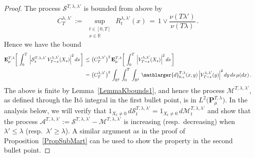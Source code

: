 \documentclass[10pt]{article}
\numberwithin{equation}{section}
\theoremstyle{definition}
\newcommand{\R}{{\mathbb R}}
\begin{document}
\begin{proof}  The process $\mathcal{S}^{T, \lambda,\lambda'}$ is bounded from above by
$$C^{\lambda,\lambda'}_T\,:=\, \sup_{ \substack{ t\in [0,T] \\ x\in \R  }  }\,R^{\lambda,\lambda'}_{t}(x)\,=\,1\vee \frac{ \nu( T\lambda'  )   }{ \nu( T\lambda  )   }    \,.$$
 Hence we have the bound
\begin{align}\label{Ebby}
    \mathbf{E}^{T,\lambda}_{\mu}\bigg[ \,\int_0^T\,\Big| \mathcal{S}_{s }^{T, \lambda,\lambda'}\,V^{\lambda, \lambda'}_{T-s }(X_s)   \Big|^2 \, ds \, \bigg]\,\leq \,&\,\big(C^{\lambda,\lambda'}_T\big)^2 \,\mathbf{E}^{T,\lambda}_{\mu}\bigg[ \,\int_0^T\,\Big| V^{\lambda, \lambda'}_{T-s }(X_s)   \Big|^2 \, ds\,  \bigg]\nonumber \\
    \,= \,&\,\big(C^{\lambda,\lambda'}_T\big)^2\, \int_{\R^2}\,\int_0^T\, \int_{\R^2}\, \mathlarger{d}_{0,s}^{T,\lambda}(x,y) \,\Big| V^{\lambda, \lambda'}_{T-s }(y)   \Big|^2  \,dy \, ds \,  \mu(dx)\,.
\end{align}
The above is finite by Lemma~\ref{LemmaKbounds1}, and hence the process $\mathcal{M}^{T, \lambda,\lambda'}$, as defined through the It\^o integral in the first bullet point, is in $L^2\big(\mathbf{P}^{T,\lambda}_{\mu}\big)$.  
In the analysis below, we will verify that $1_{X_t\neq 0}\,d\mathcal{S}_{t}^{T, \lambda ,\lambda'}=1_{X_t\neq 0}\,d\mathcal{M}_{t}^{T, \lambda ,\lambda'}$  and show that the process $\mathcal{A}^{T, \lambda ,\lambda'}:=\mathcal{S}^{T, \lambda ,\lambda'}-\mathcal{M}^{T, \lambda ,\lambda'}$ is increasing (resp.\  decreasing) when $\lambda'\leq \lambda$ (resp.\ $\lambda'\geq \lambda$).  A similar argument as in the proof of Proposition~\ref{PropSubMart}
can be used to show the property in the second bullet point.



\end{proof}
\end{document}
